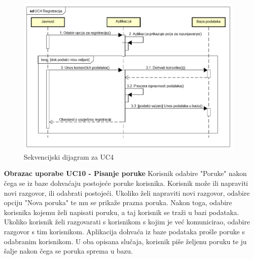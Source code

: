 				\begin{figure}[H]
					\begin{center}
						\includegraphics[width=15cm]{slike/UC4.PNG}
					\end{center}
					\caption{Sekvencijski dijagram za UC4}
					\label{fig:uc4}
				\end{figure}
			
				\textbf{Obrazac uporabe UC10 - Pisanje poruke}
				\newline
				Korisnik odabire "Poruke" nakon čega se iz baze dohvaćaju postojeće poruke korisnika. Korisnik može ili napraviti novi razgovor, ili odabrati postojeći. Ukoliko želi napraviti novi razgovor, odabire opciju "Nova poruka" te mu se prikaže prazna poruka. Nakon toga, odabire korisnika kojemu želi napisati poruku, a taj korisnik se traži u bazi podataka. Ukoliko korisnik želi razgovarati s korisnikom s kojim je već komunicirao, odabire razgovor s tim korisnikom. Aplikacija dohvaća iz baze podataka prošle poruke s odabranim korisnikom. U oba opisana slučaja, korisnik piše željenu poruku te ju šalje nakon čega se poruka sprema u bazu.
			
